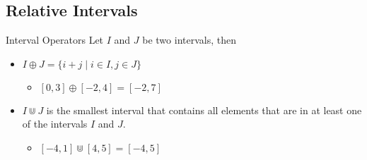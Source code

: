 \subsection{Relative Intervals}
\begin{frame}{Interval Operators}
    Let $I$ and $J$ be two intervals, then
    \begin{itemize}
        \item $I \oplus J = \{i+j \mid i \in I, j \in J \}$  
        \begin{itemize}
            \item $[0,3] \oplus [-2,4] = [-2,7]$
        \end{itemize}
        \item $I \Cup J$ is the smallest interval that contains all elements that are in at least one of the intervals $I$ and $J$.
        \begin{itemize}
            \item $[-4,1] \Cup [4,5] = [-4,5]$
        \end{itemize}
    \end{itemize}
    
\end{frame}


